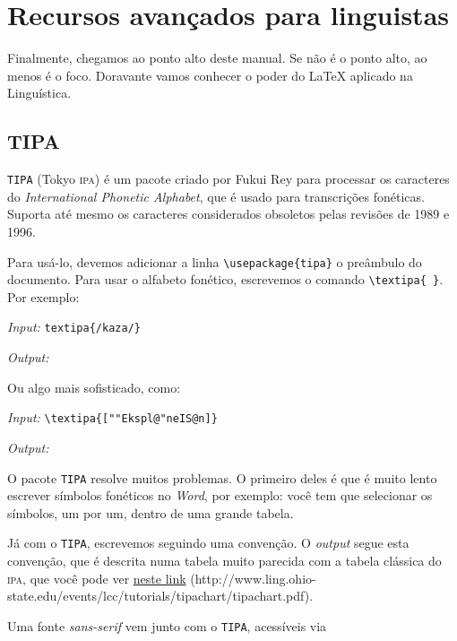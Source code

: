 \chapter{Recursos avançados para linguistas}

Finalmente, chegamos ao ponto alto deste manual. Se não é o ponto alto, ao menos é o foco. Doravante vamos conhecer o poder do \LaTeX{} aplicado na Linguística.

\section{TIPA}

\texttt{TIPA} (Tokyo \textsc{ipa}) é um pacote criado por Fukui Rey para processar os caracteres do \emph{International Phonetic Alphabet}, que é usado para transcrições fonéticas. Suporta até mesmo os caracteres considerados obsoletos pelas revisões de 1989 e 1996.

Para usá-lo, devemos adicionar a linha \verb+\usepackage{tipa}+ o preâmbulo do documento. Para usar o alfabeto fonético, escrevemos o comando \verb+\textipa{ }+. Por exemplo:

\begin{center}
\emph{Input:} \verb+textipa{/kaza/}+

\emph{Output:} 
\end{center}

Ou algo mais sofisticado, como:

\begin{center}
\emph{Input:} \verb+\textipa{[""Ekspl@"neIS@n]}+

\emph{Output:} 
\end{center}

O pacote \texttt{TIPA} resolve muitos problemas. O primeiro deles é que é muito lento escrever símbolos fonéticos no \emph{Word}, por exemplo: você tem que selecionar os símbolos, um por um, dentro de uma grande tabela.

Já com o \texttt{TIPA}, escrevemos seguindo uma convenção. O \emph{output} segue esta convenção, que é descrita numa tabela muito parecida com a tabela clássica do \textsc{ipa}, que você pode ver \href{http://www.ling.ohio-state.edu/events/lcc/tutorials/tipachart/tipachart.pdf}{neste link} (\textsf{http://www.ling.ohio-state.edu/events/lcc/tutorials/t\-ipa\-chart/t\-ipa\-chart.pdf}).

Uma fonte \emph{sans-serif} vem junto com o \texttt{TIPA}, acessíveis via 

